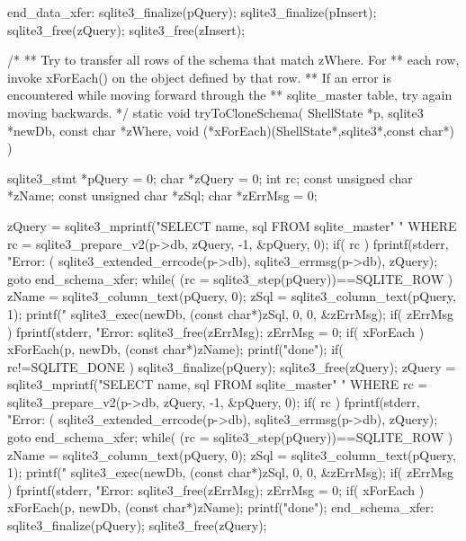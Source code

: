 \begin{Codex}[label=shell.c,numbers=left]
{end_data_xfer:
  sqlite3_finalize(pQuery);
  sqlite3_finalize(pInsert);
  sqlite3_free(zQuery);
  sqlite3_free(zInsert);
}


/*
** Try to transfer all rows of the schema that match zWhere.  For
** each row, invoke xForEach() on the object defined by that row.
** If an error is encountered while moving forward through the
** sqlite_master table, try again moving backwards.
*/
static void tryToCloneSchema(
  ShellState *p,
  sqlite3 *newDb,
  const char *zWhere,
  void (*xForEach)(ShellState*,sqlite3*,const char*)
){
  sqlite3_stmt *pQuery = 0;
  char *zQuery = 0;
  int rc;
  const unsigned char *zName;
  const unsigned char *zSql;
  char *zErrMsg = 0;

  zQuery = sqlite3_mprintf("SELECT name, sql FROM sqlite_master"
                           " WHERE %
  rc = sqlite3_prepare_v2(p->db, zQuery, -1, &pQuery, 0);
  if( rc ){
    fprintf(stderr, "Error: (%
                    sqlite3_extended_errcode(p->db), sqlite3_errmsg(p->db),
                    zQuery);
    goto end_schema_xfer;
  }
  while( (rc = sqlite3_step(pQuery))==SQLITE_ROW ){
    zName = sqlite3_column_text(pQuery, 0);
    zSql = sqlite3_column_text(pQuery, 1);
    printf("%
    sqlite3_exec(newDb, (const char*)zSql, 0, 0, &zErrMsg);
    if( zErrMsg ){
      fprintf(stderr, "Error: %
      sqlite3_free(zErrMsg);
      zErrMsg = 0;
    }
    if( xForEach ){
      xForEach(p, newDb, (const char*)zName);
    }
    printf("done\n");
  }
  if( rc!=SQLITE_DONE ){
    sqlite3_finalize(pQuery);
    sqlite3_free(zQuery);
    zQuery = sqlite3_mprintf("SELECT name, sql FROM sqlite_master"
                             " WHERE %
    rc = sqlite3_prepare_v2(p->db, zQuery, -1, &pQuery, 0);
    if( rc ){
      fprintf(stderr, "Error: (%
                      sqlite3_extended_errcode(p->db), sqlite3_errmsg(p->db),
                      zQuery);
      goto end_schema_xfer;
    }
    while( (rc = sqlite3_step(pQuery))==SQLITE_ROW ){
      zName = sqlite3_column_text(pQuery, 0);
      zSql = sqlite3_column_text(pQuery, 1);
      printf("%
      sqlite3_exec(newDb, (const char*)zSql, 0, 0, &zErrMsg);
      if( zErrMsg ){
        fprintf(stderr, "Error: %
        sqlite3_free(zErrMsg);
        zErrMsg = 0;
      }
      if( xForEach ){
        xForEach(p, newDb, (const char*)zName);
      }
      printf("done\n");
    }
  }
end_schema_xfer:
  sqlite3_finalize(pQuery);
  sqlite3_free(zQuery);
}


\end{Codex}
